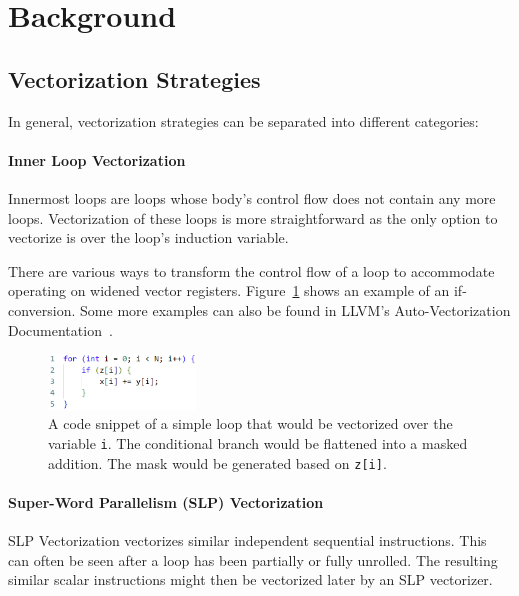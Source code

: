 \documentclass[sigplan,11pt,nonacm]{acmart}
\begin{document}


\section{Background}
\label{sec:background}

\subsection{Vectorization Strategies}
\label{back:vec-strat}
In general, vectorization strategies can be separated into different categories:

\paragraph{Inner Loop Vectorization}
Innermost loops are loops whose body's control flow does not contain any more loops.
Vectorization of these loops is more straightforward as the only option to vectorize is over 
the loop's induction variable.

There are various ways to transform the control flow of a loop to accommodate operating on widened
vector registers. Figure~\ref{fig:inner-loop-vec} shows an example of an if-conversion. Some more
examples can also be found in LLVM's Auto-Vectorization Documentation~\cite{llvmvec}.

\begin{figure}
  \centering
  \includegraphics[width=0.35\textwidth]{images/inner-loop-vec.png}
  \caption{A code snippet of a simple loop that would be vectorized over the variable \texttt{i}. 
  The conditional branch would be flattened into a masked addition. The mask would be generated 
  based on \texttt{z[i]}.}
  \label{fig:inner-loop-vec}
\end{figure}

\paragraph{Super-Word Parallelism (SLP) Vectorization}
SLP Vectorization vectorizes similar independent sequential instructions. This can often be seen 
after a loop has been partially or fully unrolled. The resulting similar scalar 
instructions might then be vectorized later by an SLP vectorizer.
\end{document}
